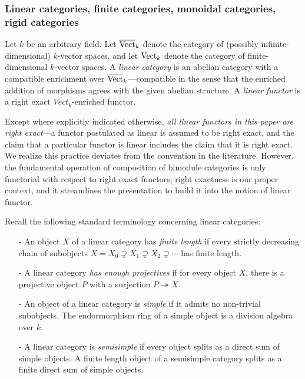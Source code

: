 \documentclass{amsart}
\begin{document}
\subsubsection{Linear categories, finite categories, monoidal categories, rigid categories}

Let $k$ be an arbitrary field.  Let $\overline{\mathrm{Vect}}_k$ denote the category of (possibly infinite-dimensional) $k$-vector spaces, and let $\mathrm{Vect}_k$ denote the category of finite-dimensional $k$-vector spaces.  A \emph{linear category} is an abelian category with a compatible enrichment over $\overline{\mathrm{Vect}}_k$---compatible in the sense that the enriched addition of morphisms agrees with the given abelian structure.  A \emph{linear functor} is a right exact $\overline{Vect}_k$-enriched functor. %

\begin{warning}
Except where explicitly indicated otherwise, \emph{all linear functors in this paper are right exact}---a functor postulated as linear is assumed to be right exact, and the claim that a particular functor is linear includes the claim that it is right exact.  We realize this practice deviates from the convention in the literature.  However, the fundamental operation of composition of bimodule categories is only functorial with respect to right exact functors; right exactness is our proper context, and it streamlines the presentation to build it into the notion of linear functor.
\end{warning}

Recall the following standard terminology concerning linear categories:
\begin{itemize}
	\item[-] An object $X$ of a linear category has {\em finite length} if every strictly decreasing chain of subobjects $X = X_0 \supsetneq X_1 \supsetneq X_2 \supsetneq  \cdots$ has finite length. 
	\item[-] A linear category {\em has enough projectives} if for every object $X$, there is a projective object $P$ with a surjection $P \twoheadrightarrow X$. 
	\item[-] An object of a linear category is {\em simple} if it admits no non-trivial subobjects. The endormorphism ring of a simple object is a division algebra over $k$. %
	\item[-] A linear category is {\em semisimple} if every object splits as a direct sum of simple objects.  A finite length object of a semisimple category splits as a finite direct sum of simple objects.  %
\end{itemize}
\end{document}
